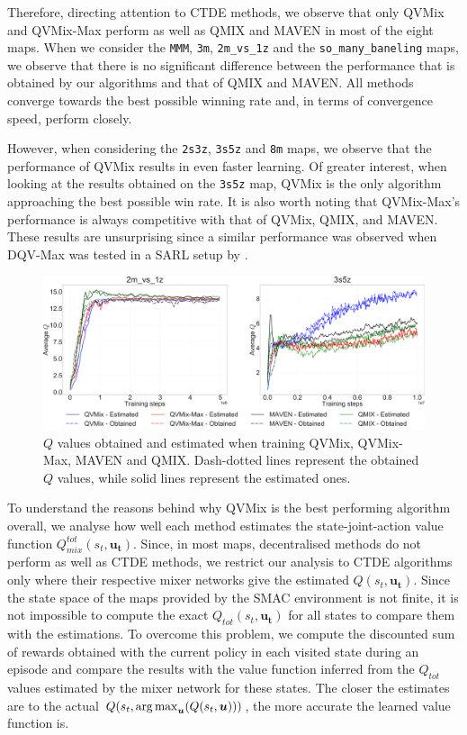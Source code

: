 Therefore, directing attention to CTDE methods, we observe that only QVMix and QVMix-Max perform as well as QMIX and MAVEN in most of the eight maps.
When we consider the \texttt{MMM}, \texttt{3m}, \texttt{2m\_vs\_1z} and the \texttt{so\_many\_baneling} maps, we observe that there is no significant difference between the performance that is obtained by our algorithms and that of QMIX and MAVEN. 
All methods converge towards the best possible winning rate and, in terms of convergence speed, perform closely.

However, when considering the \texttt{2s3z}, \texttt{3s5z} and \texttt{8m} maps, we observe that the performance of QVMix results in even faster learning. 
Of greater interest, when looking at the results obtained on the \texttt{3s5z} map, QVMix is the only algorithm approaching the best possible win rate.
It is also worth noting that QVMix-Max's performance is always competitive with that of QVMix, QMIX, and MAVEN.
These results are unsurprising since a similar performance was observed when DQV-Max was tested in a SARL setup by \cite{sabatelli2020deep}.

\begin{figure}
\centering
\includegraphics[width=.95\linewidth]{tex_thesis/figures/ch4/2m1z3s5zQ.pdf}
\caption{$Q$ values obtained and estimated when training QVMix, QVMix-Max, MAVEN and QMIX. Dash-dotted lines represent the obtained $Q$ values, while solid lines represent the estimated ones.}
\label{fig:exp_plots_overestim:q_best_worse}
\end{figure}

To understand the reasons behind why QVMix is the best performing algorithm overall, we analyse how well each method estimates the state-joint-action value function $Q_{mix}^{tot}(s_t, \mathbf{u_t})$. 
Since, in most maps, decentralised methods do not perform as well as CTDE methods, we restrict our analysis to CTDE algorithms only where their respective mixer networks give the estimated $Q(s_t, \mathbf{u_t})$.
Since the state space of the maps provided by the SMAC environment is not finite, it is not impossible to compute the exact $Q_{tot}(s_t, \mathbf{u_t})$ for all states to compare them with the estimations.
To overcome this problem, we compute the discounted sum of rewards obtained with the current policy in each visited state during an episode and compare the results with the value function inferred from the $Q_{tot}$ values estimated by the mixer network for these states.
The closer the estimates are to the actual $Q(s_t, \argmax_{\mathbf{u}}(Q(s_t,\mathbf{u})))$, the more accurate the learned value function is.

